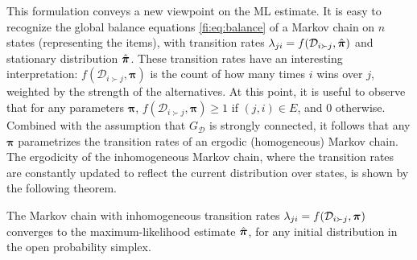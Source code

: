 This formulation conveys a new viewpoint on the ML estimate.
It is easy to recognize the global balance equations \eqref{fi:eq:balance} of a Markov chain on $n$ states (representing the items), with transition rates $\lambda_{ji} = f(\mathcal{D}_{i \succ j}, \hat{\bm{\pi}})$ and stationary distribution $\hat{\bm{\pi}}$.
These transition rates have an interesting interpretation: $f(\mathcal{D}_{i \succ j}, \bm{\pi})$ is the count of how many times $i$ wins over $j$, weighted by the strength of the alternatives.
At this point, it is useful to observe that for any parameters $\bm{\pi}$, $f(\mathcal{D}_{i \succ j}, \bm{\pi}) \ge 1$ if $(j,i) \in E$, and $0$ otherwise.
Combined with the assumption that $G_\mathcal{D}$ is strongly connected, it follows that any $\bm{\pi}$ parametrizes the transition rates of an ergodic (homogeneous) Markov chain.
The ergodicity of the inhomogeneous Markov chain, where the transition rates are constantly updated to reflect the current distribution over states, is shown by the following theorem.
\begin{theorem}
\label{fi:thm:convergence}
The Markov chain with inhomogeneous transition rates $\lambda_{ji} = f(\mathcal{D}_{i \succ j}, \bm{\pi})$ converges to the maximum-likelihood estimate $\hat{\bm{\pi}}$, for any initial distribution in the open probability simplex.
\end{theorem}

